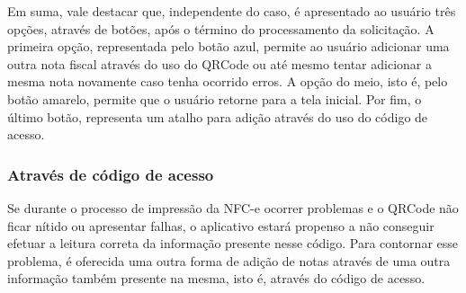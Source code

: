 \newpage
Em suma, vale destacar que, independente do caso, é apresentado ao usuário três opções, através de botões, após o término do processamento da solicitação. A primeira opção, representada pelo botão azul, permite ao usuário adicionar uma outra nota fiscal através do uso do QRCode ou até mesmo tentar adicionar a mesma nota novamente caso tenha ocorrido erros. A opção do meio, isto é, pelo botão amarelo, permite que o usuário retorne para a tela inicial. Por fim, o último botão, representa um atalho para adição através do uso do código de acesso.

\subsubsection{Através de código de acesso}

Se durante o processo de impressão da NFC-e ocorrer problemas e o QRCode não ficar nítido ou apresentar falhas, o aplicativo estará propenso a não conseguir efetuar a leitura correta da informação presente nesse código. Para contornar esse problema, é oferecida uma outra forma de adição de notas através de uma outra informação também presente na mesma, isto é, através do código de acesso.

